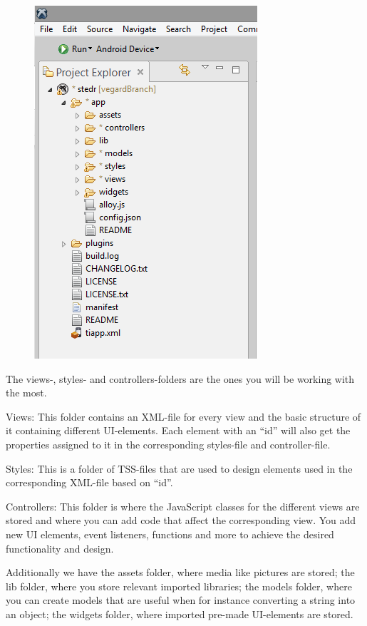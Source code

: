 \begin{figure}
\begin{center}
\includegraphics[scale=0.45]{guide/f5.png} 
\end{center}
\end{figure}

The views-, styles- and controllers-folders are the ones you will be working with the most.

Views:
This folder contains an XML-file for every view and the basic structure of it containing different UI-elements. Each element with an “id” will also get the properties assigned to it in the corresponding styles-file and controller-file.

Styles:
This is a folder of TSS-files that are used to design elements used in the corresponding XML-file based on “id”.

Controllers:
This folder is where the JavaScript classes for the different views are stored and where you can add code that affect the corresponding view. You add new UI elements,  event listeners, functions and more to achieve the desired functionality and design.


Additionally we have the assets folder, where media like pictures are stored; the lib folder, where you store relevant imported libraries; the models folder, where you can create models that are useful when for instance converting a string into an object; the widgets folder, where imported pre-made UI-elements are stored.


